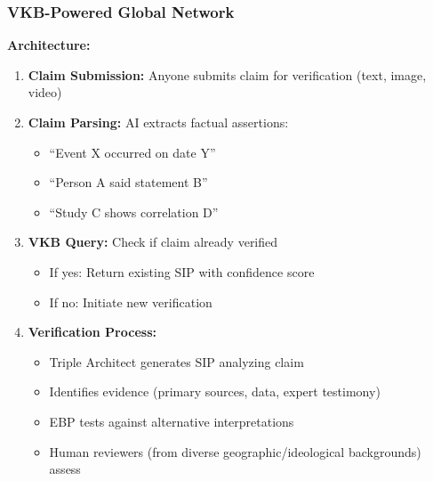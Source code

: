 \documentclass[11pt,a4paper]{article}
\theoremstyle{definition}
\theoremstyle{remark}
\newcommand{\VKB}{\textsc{VKB}}
\newcommand{\SIP}{\textsc{SIP}}
\newcommand{\EBP}{\textsc{EBP}}
\begin{document}
\subsubsection{VKB-Powered Global Network}

\begin{mdframed}[style=implementationbox, frametitle={Decentralized Fact-Checking Protocol}]
\textbf{Architecture:}
\begin{enumerate}
    \item \textbf{Claim Submission:} Anyone submits claim for verification (text, image, video)
    
    \item \textbf{Claim Parsing:} AI extracts factual assertions:
    \begin{itemize}
        \item ``Event X occurred on date Y''
        \item ``Person A said statement B''
        \item ``Study C shows correlation D''
    \end{itemize}
    
    \item \textbf{\VKB{} Query:} Check if claim already verified
    \begin{itemize}
        \item If yes: Return existing \SIP{} with confidence score
        \item If no: Initiate new verification
    \end{itemize}
    
    \item \textbf{Verification Process:}
    \begin{itemize}
        \item Triple Architect generates \SIP{} analyzing claim
        \item Identifies evidence (primary sources, data, expert testimony)
        \item \EBP{} tests against alternative interpretations
        \item Human reviewers (from diverse geographic/ideological backgrounds) assess
    \end{itemize}
    

\end{enumerate}
\end{mdframed}
\end{document}
